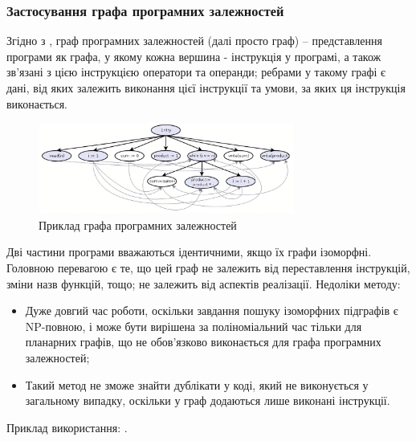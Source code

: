 \documentclass[a4paper, 14pt]{article}
\begin{document}
\subsubsection{Застосування графа програмних залежностей}
Згідно з \cite{Ferrante87}, граф програмних залежностей (далі просто граф) -- представлення програми як графа, у якому кожна вершина - інструкція у програмі, а також зв'язані з цією інструкцією оператори та операнди; ребрами у такому графі є дані, від яких залежить виконання цієї інструкції та умови, за яких ця інструкція виконається.
\begin{figure}[h]
    \centering
    \includegraphics[width=0.75\textwidth]{pdg-example}
    \caption{Приклад графа програмних залежностей \cite{pdg-example}}
    \label{fig:pdg-example}
\end{figure} 
Дві частини програми вважаються ідентичними, якщо їх графи ізоморфні.
Головною перевагою є те, що цей граф не залежить від переставлення інструкцій, зміни назв функцій, тощо; не залежить від аспектів реалізації.
Недоліки методу:
\begin{itemize}
\item Дуже довгий час роботи, оскільки завдання пошуку ізоморфних підграфів є NP-повною, і може бути вирішена за поліноміальний час тільки для планарних графів, що не обов'язково виконається для графа програмних залежностей;
\item Такий метод не зможе знайти дублікати у коді, який не виконується у загальному випадку, оскільки у граф додаються лише виконані інструкції.
\end{itemize}
Приклад використання: \cite{Liu06}.
\end{document}
